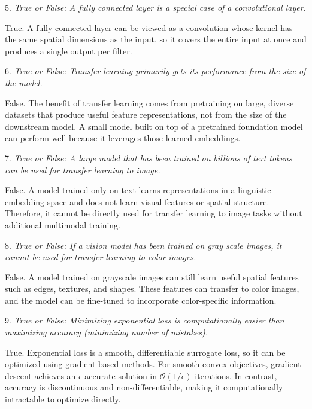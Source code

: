 \vspace{1cm}

5. \textit{True or False: A fully connected layer is a special case of a convolutional layer.}

True. A fully connected layer can be viewed as a convolution whose kernel has the same spatial dimensions as the input, so it covers the entire input at once and produces a single output per filter.

\vspace{1cm}

6. \textit{True or False: Transfer learning primarily gets its performance from the size of the model.}

False. The benefit of transfer learning comes from pretraining on large, diverse datasets that produce useful feature representations, not from the size of the downstream model. A small model built on top of a pretrained foundation model can perform well because it leverages those learned embeddings.

\vspace{1cm}

7. \textit{True or False: A large model that has been trained on billions of text tokens can be used for transfer learning to image.}

False. A model trained only on text learns representations in a linguistic embedding space and does not learn visual features or spatial structure. Therefore, it cannot be directly used for transfer learning to image tasks without additional multimodal training.

\vspace{1cm}

8. \textit{True or False: If a vision model has been trained on gray scale images, it cannot be used for transfer learning to color images.}

False. A model trained on grayscale images can still learn useful spatial features such as edges, textures, and shapes. These features can transfer to color images, and the model can be fine-tuned to incorporate color-specific information.

\vspace{1cm}

9. \textit{True or False: Minimizing exponential loss is computationally easier than maximizing accuracy (minimizing number of mistakes).}

True. Exponential loss is a smooth, differentiable surrogate loss, so it can be optimized using gradient-based methods. For smooth convex objectives, gradient descent achieves an $\epsilon$-accurate solution in $\mathcal{O}(1/\epsilon)$ iterations. In contrast, accuracy is discontinuous and non-differentiable, making it computationally intractable to optimize directly.

